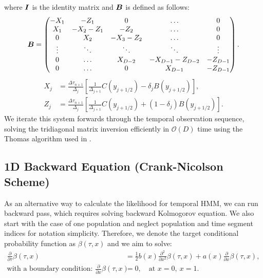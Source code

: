 \documentclass{article}
\def\B{\mbox{\boldmath $B$}}
\def\I{\mbox{\boldmath $I$}}
\begin{document}
\begin{enumerate}
    where $\I$ is the identity matrix and $\B$ is defined as follows:
    \begin{equation}\label{eq:forward_cc_matrix}
    \B =
    \begin{pmatrix}
        -X_1 & -Z_1 & 0 & \hdots & 0 \\
        X_1 & -X_2 - Z_1 & -Z_2 & \hdots & 0 \\
        0 & X_2 & -X_3 - Z_2 & \hdots & 0 \\
        \vdots & \ddots & \ddots & \ddots & \vdots\\
        0 & \hdots & X_{D-2} & -X_{D-1} - Z_{D-2} & -Z_{D-1} \\
        0 & \hdots & 0 & X_{D-1} & - Z_{D-1}
    \end{pmatrix}.
    \end{equation}
    $$
    \begin{aligned}
        X_j &= \frac{\Delta \tau_{n+1}}{\Delta_j} \left[ \frac{1}{\Delta_{j+1}} C(y_{j+1/2}) - \delta_j B(y_{j+1/2}) \right], \\
        Z_j &= \frac{\Delta \tau_{n+1}}{\Delta_j} \left[ \frac{1}{\Delta_{j+1}} C(y_{j+1/2}) + (1-\delta_j) B(y_{j+1/2}) \right].
    \end{aligned}
    $$
    We iterate this system forwards through the temporal observation sequence, solving the tridiagonal matrix inversion efficiently in $\mathcal{O}(D)$ time using the Thomas algorithm used in \citet{gutenkunst2009}.
\end{enumerate}

\subsection{1D Backward Equation (Crank-Nicolson Scheme)}

As an alternative way to calculate the likelihood for temporal HMM, we can run backward pass, which requires solving backward Kolmogorov equation.
We also start with the case of one population and neglect population and time segment indices for notation simplicity.
Therefore, we denote the target conditional probability function as $\beta(\tau, x)$ and we aim to solve:
\begin{equation*}
\begin{split}
\frac{\partial}{\partial \tau}\beta(\tau,x) &= \frac{1}{2}b(x) \frac{\partial^2}{\partial x^2} \beta(\tau,x) + a(x) \frac{\partial}{\partial x} \beta(\tau,x), \\
\text{with a boundary condition: } \frac{\partial}{\partial x}\beta(\tau,x) &= 0, \quad \text{at } x=0,\ x=1.
\end{split}
\end{equation*}
\end{document}
